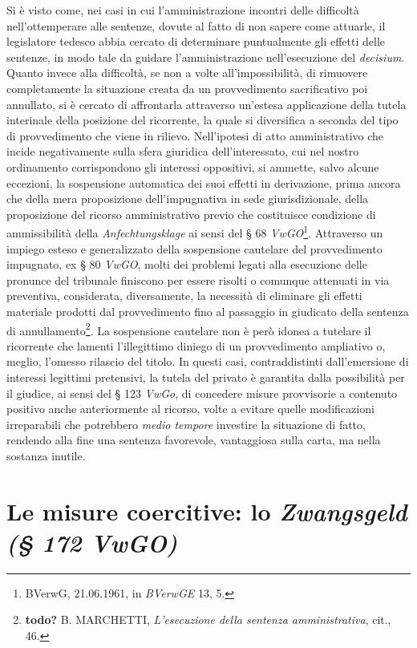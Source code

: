 \documentclass[12pt,it,a4paper,]{report}
\begin{document}
Si è visto come, nei casi in cui l'amministrazione incontri delle
difficoltà nell'ottemperare alle sentenze, dovute al fatto di non sapere
come attuarle, il legislatore tedesco abbia cercato di determinare
puntualmente gli effetti delle sentenze, in modo tale da guidare
l'amministrazione nell'esecuzione del \emph{decisium}. Quanto invece
alla difficoltà, se non a volte all'impossibilità, di rimuovere
completamente la situazione creata da un provvedimento sacrificativo poi
annullato, si è cercato di affrontarla attraverso un'estesa applicazione
della tutela interinale della posizione del ricorrente, la quale si
diversifica a seconda del tipo di provvedimento che viene in rilievo.
Nell'ipotesi di atto amministrativo che incide negativamente sulla sfera
giuridica dell'interessato, cui nel nostro ordinamento corrispondono gli
interessi oppositivi, si ammette, salvo alcune eccezioni, la sospensione
automatica dei suoi effetti in derivazione, prima ancora che della mera
proposizione dell'impugnativa in sede giurisdizionale, della
proposizione del ricorso amministrativo previo che costituisce
condizione di ammissibilità della \emph{Anfechtungsklage} ai sensi del §
68 \emph{VwGO}\footnote{BVerwG, 21.06.1961, in \emph{BVerwGE} 13, 5.}.
Attraverso un impiego esteso e generalizzato della sospensione cautelare
del provvedimento impugnato, ex § 80 \emph{VwGO}, molti dei problemi
legati alla esecuzione delle pronunce del tribunale finiscono per essere
risolti o comunque attenuati in via preventiva, considerata,
diversamente, la necessità di eliminare gli effetti materiale prodotti
dal provvedimento fino al passaggio in giudicato della sentenza di
annullamento\footnote{\textbf{todo?} B. MARCHETTI, \emph{L'esecuzione
  della sentenza amministrativa}, cit., 46.}. La sospensione cautelare
non è però idonea a tutelare il ricorrente che lamenti l'illegittimo
diniego di un provvedimento ampliativo o, meglio, l'omesso rilascio del
titolo. In questi casi, contraddistinti dall'emersione di interessi
legittimi pretensivi, la tutela del privato è garantita dalla
possibilità per il giudice, ai sensi del § 123 \emph{VwGo}, di concedere
misure provvisorie a contenuto positivo anche anteriormente al ricorso,
volte a evitare quelle modificazioni irreparabili che potrebbero
\emph{medio tempore} investire la situazione di fatto, rendendo alla
fine una sentenza favorevole, vantaggiosa sulla carta, ma nella sostanza
inutile.

\hypertarget{le-misure-coercitive-lo-zwangsgeld-172-vwgo}{%
\section{\texorpdfstring{Le misure coercitive: lo \emph{Zwangsgeld (§
172
VwGO)}}{Le misure coercitive: lo Zwangsgeld (§ 172 VwGO)}}\label{le-misure-coercitive-lo-zwangsgeld-172-vwgo}}
\end{document}
